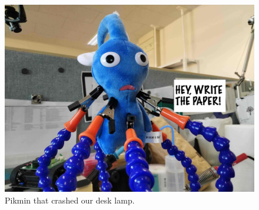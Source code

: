 {
  \begin{figure}[t]
    \centering
    \includegraphics[width=1\linewidth]{fig/raw/tmp.jpg}
    \caption{Pikmin that crashed our desk lamp.}
    \label{fig:tmp}
  \end{figure}
}
